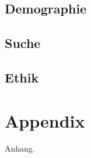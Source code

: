 \documentclass{Bericht}
\begin{document}
\subsection{Demographie}
\subsection{Suche}
\subsection{Ethik}



\newpage
\section{Appendix} %
	Anhang.
	
\vfill %

\printbibliography
\end{document}
